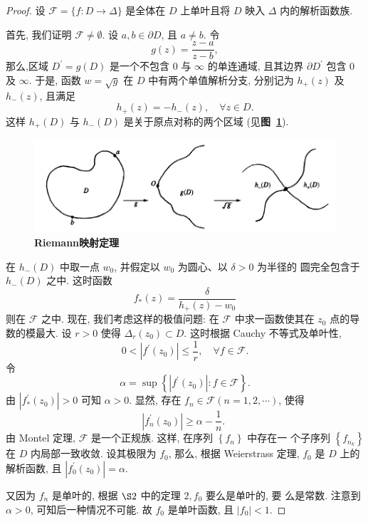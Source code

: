 \begin{proof}
    设 $\mathscr{F}=\{f\colon D\to \Delta\}$ 是全体在 $D$ 上单叶且将 $D$ 映入 $\Delta$ 内的解析函数族.

    首先, 我们证明 $\mathscr{F}\neq \emptyset$. 设 $a,b\in \partial D$, 且 $a\neq b$. 令
    $$
g(z)=\frac{z-a}{z-b},
$$
那么,区域 $D^{\prime}=g(D)$ 是一个不包含 0 与 $\infty$ 的单连通域, 且其边界 $\partial D^{\prime}$ 包含 0 及 $\infty$. 于是, 函数 $w=\sqrt{g}$ 在 $D$ 中有两个单值解析分支, 分别记为 $h_{+}(z)$ 及 $h_{-}(z)$, 且满足
$$
h_{+}(z)=-h_{-}(z), \quad \forall z \in D .
$$
这样 $h_{+}(D)$ 与 $h_{-}(D)$ 是关于原点对称的两个区域 (见\textbf{图~\ref{fig:riemann mappings}}).
\begin{figure}[ht]
    \centering
    \includegraphics{figures/riemann mapping thm.png}
    \caption{\textbf{Riemann映射定理}}
    \label{fig:riemann mappings}
\end{figure}
在 $h_{-}(D)$ 中取一点 $w_0$, 并假定以 $w_0$ 为圆心、以 $\delta>0$ 为半径的 圆完全包含于 $h_{-}(D)$ 之中. 这时函数
$$
f_*(z)=\frac{\delta}{h_{+}(z)-w_0}
$$
则在 $\mathscr{F}$ 之中.
现在, 我们考虑这样的极值问题: 在 $\mathscr{F}$ 中求一函数使其在 $z_0$ 点的导数的模最大.
设 $r>0$ 使得 $\Delta_r\left(z_0\right) \subset D$. 这时根据 Cauchy 不等式及单叶性,
$$
0<\left|f^{\prime}\left(z_0\right)\right| \leqslant \frac{1}{r}, \quad \forall f \in \mathscr{F} .
$$
令
$$
\alpha=\sup \left\{\left|f^{\prime}\left(z_0\right)\right|: f \in \mathscr{F}\right\} .
$$
由 $\left|f_*^{\prime}\left(z_0\right)\right|>0$ 可知 $\alpha>0$. 显然, 存在 $f_n \in \mathscr{F}(n=1,2, \cdots)$, 使得
$$
\left|f_n^{\prime}\left(z_0\right)\right| \geqslant \alpha-\frac{1}{n} \text {. }
$$
由 Montel 定理, $\mathscr{F}$ 是一个正规族. 这样, 在序列 $\left\{f_n\right\}$ 中存在一 个子序列 $\left\{f_{n_k}\right\}$ 在 $D$ 内局部一致收敛. 设其极限为 $f_0$, 那么, 根据
Weierstrass 定理, $f_0$ 是 $D$ 上的解析函数, 且 $\left|f_0^{\prime}\left(z_0\right)\right|=\alpha$.

又因为 $f_n$ 是单叶的, 根据 $\S 2$ 中的定理 $2, f_0$ 要么是单叶的, 要 么是常数. 注意到 $\alpha>0$, 可知后一种情况不可能. 故 $f_0$ 是单叶函数, 且 $\left|f_0\right|<1$.


\end{proof}
